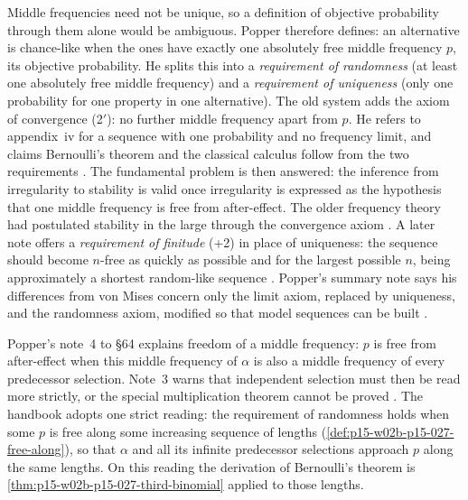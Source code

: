 Middle frequencies need not be unique, so a definition of objective
probability through them alone would be ambiguous. Popper therefore
defines: an alternative is chance-like when the ones have exactly one
absolutely free middle frequency \(p\), its objective probability. He
splits this into a \emph{requirement of randomness} (at least one
absolutely free middle frequency) and a \emph{requirement of uniqueness}
(only one probability for one property in one alternative). The old
system adds the axiom of convergence (2\('\)): no further middle
frequency apart from \(p\). He refers to appendix~iv for a sequence with
one probability and no frequency limit, and claims Bernoulli's theorem
and the classical calculus follow from the two requirements
\parencite[\S64]{Popper2002LogicDiscoveryUI}. The fundamental problem
is then answered: the inference from irregularity to stability is valid
once irregularity is expressed as the hypothesis that one middle
frequency is free from after-effect. The older frequency theory had
postulated stability in the large through the convergence axiom
\parencite[\S64]{Popper2002LogicDiscoveryUI}. A later note offers a
\emph{requirement of finitude} (+2) in place of uniqueness: the sequence
should become \(n\)-free as quickly as possible and for the largest
possible \(n\), being approximately a shortest random-like sequence
\parencite[\S64, note~*2]{Popper2002LogicDiscoveryUI}. Popper's summary
note says his differences from von Mises concern only the limit axiom,
replaced by uniqueness, and the randomness axiom, modified so that model
sequences can be built \parencite[\S64, note~7]{Popper2002LogicDiscoveryUI}.

Popper's note~4 to \S64 explains freedom of a middle frequency: \(p\) is
free from after-effect when this middle frequency of \(\alpha\) is also a
middle frequency of every predecessor selection. Note~3 warns that
independent selection must then be read more strictly, or the special
multiplication theorem cannot be proved
\parencite[\S64, notes~3 and~4]{Popper2002LogicDiscoveryUI}. The
handbook adopts one strict reading: the requirement of randomness holds
when some \(p\) is free along some increasing sequence of lengths
(\cref{def:p15-w02b-p15-027-free-along}), so that \(\alpha\) and all its
infinite predecessor selections approach \(p\) along the same lengths.
On this reading the derivation of Bernoulli's theorem is
\cref{thm:p15-w02b-p15-027-third-binomial} applied to those lengths.


